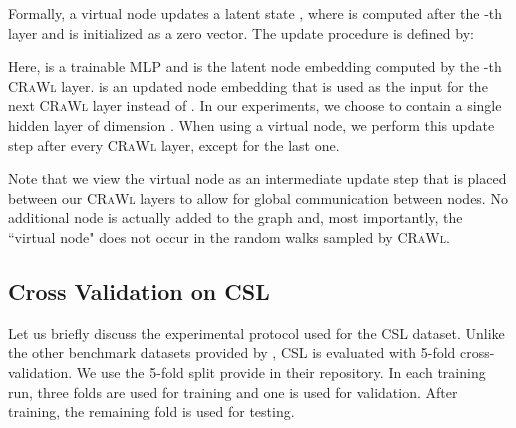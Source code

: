 \documentclass{scrartcl} \usepackage[dvipsnames]{xcolor}
\newcommand{\crawl}{\textsc{CRaWl}}
\begin{document}
Formally, a virtual node updates a latent state , where  is computed after the -th layer and  is initialized as a zero vector.
The update procedure is defined by:

Here,  is a trainable MLP and  is the latent node embedding computed by the -th \crawl{} layer.
 is an updated node embedding that is used as the input for the next \crawl{} layer instead of .
In our experiments, we choose  to contain a single hidden layer of dimension .
When using a virtual node, we perform this update step after every \crawl{} layer, except for the last one.

Note that we view the virtual node as an intermediate update step that is placed between our \crawl{} layers to allow for global communication between nodes.
No additional node is actually added to the graph and, most importantly, the ``virtual node" does not occur in the random walks sampled by \crawl{}.

\subsection{Cross Validation on CSL}
Let us briefly discuss the experimental protocol used for the CSL dataset.
Unlike the other benchmark datasets provided by \citet{dwivedi2020benchmarkgnns}, CSL is evaluated with 5-fold cross-validation.
We use the 5-fold split \citet{dwivedi2020benchmarkgnns} provide in their repository.
In each training run, three folds are used for training and one is used for validation.
After training, the remaining fold is used for testing.
\end{document}
